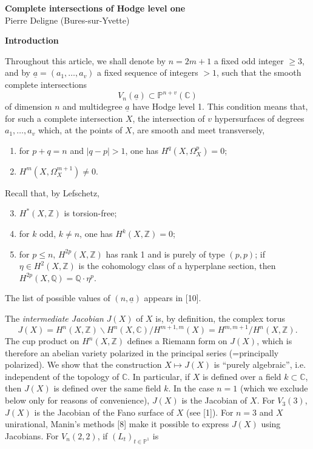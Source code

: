 \documentclass[10pt]{article}
\newcommand{\C}{\mathbb C}
\newcommand{\Pj}{\mathbb P}
\newcommand{\Q}{\mathbb Q}
\newcommand{\Z}{\mathbb Z}
\begin{document}
\fontsize{9.4}{11.15}\selectfont

\begin{center}
{\Large\bfseries Complete intersections of Hodge level one}\\[0.45em]
Pierre Deligne (Bures-sur-Yvette)
\end{center}

\begin{center}\bfseries Introduction\end{center}

Throughout this article, we shall denote by \(n=2m+1\) a fixed odd integer \(\geq 3\), and by \(\underline a=(a_1,\ldots,a_v)\) a fixed sequence of integers \(>1\), such that the smooth complete intersections
\[
V_n(\underline a)\subset \Pj^{n+v}(\C)
\]
of dimension \(n\) and multidegree \(\underline a\) have Hodge level 1. This condition means that, for such a complete intersection \(X\), the intersection of \(v\) hypersurfaces of degrees \(a_1,\ldots,a_v\) which, at the points of \(X\), are smooth and meet transversely,
\begin{enumerate}[label=\alph*)]
\item for \(p+q=n\) and \(|q-p|>1\), one has \(H^q(X,\Omega_X^p)=0\);
\item \(H^m(X,\Omega_X^{m+1})\ne0\).
\end{enumerate}
Recall that, by Lefschetz,
\begin{enumerate}[label=\alph*)]
\setcounter{enumi}{2}
\item \(H^*(X,\Z)\) is torsion-free;
\item for \(k\) odd, \(k\ne n\), one has \(H^k(X,\Z)=0\);
\item for \(p\le n\), \(H^{2p}(X,\Z)\) has rank 1 and is purely of type \((p,p)\); if \(\eta\in H^2(X,\Z)\) is the cohomology class of a hyperplane section, then \(H^{2p}(X,\Q)=\Q\cdot\eta^p\).
\end{enumerate}
The list of possible values of \((n,\underline a)\) appears in [10].

The \emph{intermediate Jacobian} \(J(X)\) of \(X\) is, by definition, the complex torus
\[
J(X)=H^n(X,\Z)\backslash H^n(X,\C)/H^{m+1,m}(X)
     =H^{m,m+1}/H^n(X,\Z).
\]
The cup product on \(H^n(X,\Z)\) defines a Riemann form on \(J(X)\), which is therefore an abelian variety polarized in the principal series (=principally polarized). We show that the construction \(X\mapsto J(X)\) is ``purely algebraic'', i.e. independent of the topology of \(\C\). In particular, if \(X\) is defined over a field \(k\subset\C\), then \(J(X)\) is defined over the same field \(k\). In the case \(n=1\) (which we exclude below only for reasons of convenience), \(J(X)\) is the Jacobian of \(X\). For \(V_3(3)\), \(J(X)\) is the Jacobian of the Fano surface of \(X\) (see [1]). For \(n=3\) and \(X\) unirational, Manin's methods [8] make it possible to express \(J(X)\) using Jacobians. For \(V_n(2,2)\), if \((L_t)_{t\in\Pj^1}\) is
\end{document}
